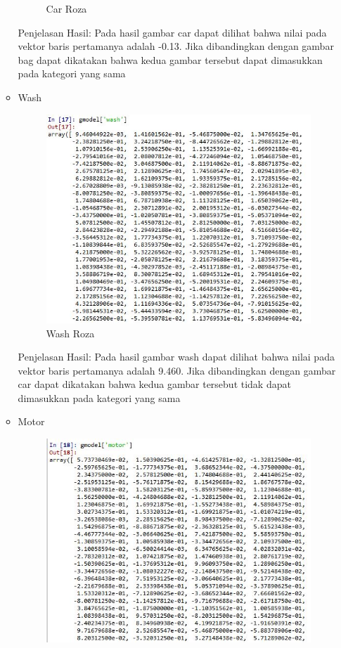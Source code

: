 \begin{enumerate}
\begin{itemize}
\begin{figure}[!hbtp]
\caption{Car Roza}
\label{text-fadila}
\end{figure}
\par Penjelasan Hasil: Pada hasil gambar car dapat dilihat bahwa nilai pada vektor baris pertamanya adalah -0.13. Jika dibandingkan dengan gambar bag dapat dikatakan bahwa kedua gambar tersebut  dapat dimasukkan pada kategori yang sama
\item Wash
\begin{figure}[!hbtp]
\centering
\includegraphics[scale=0.6]{figures/washroza.jpg}
\caption{Wash Roza}
\label{text-fadila}
\end{figure}
\par Penjelasan Hasil: Pada hasil gambar wash dapat dilihat bahwa nilai pada vektor baris pertamanya adalah 9.460. Jika dibandingkan dengan gambar car dapat dikatakan bahwa kedua gambar tersebut tidak dapat dimasukkan pada kategori yang sama
\item Motor
\begin{figure}[!hbtp]
\centering
\includegraphics[scale=0.6]{figures/motorroza.jpg}

\end{figure}
\end{itemize}
\end{enumerate}
